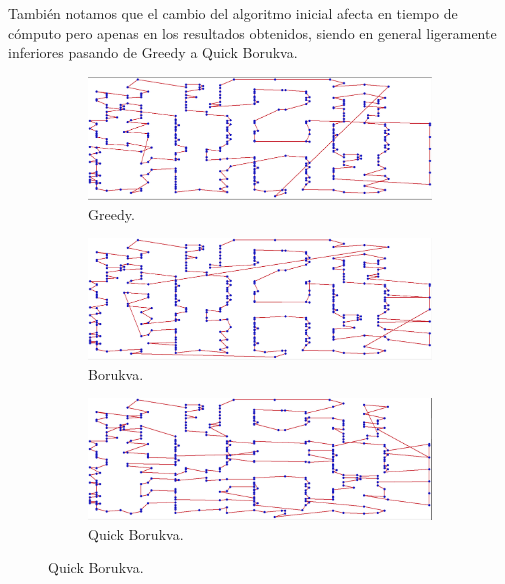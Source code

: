 \documentclass[13pt,a4paper]{article}
\begin{document}
También notamos que el cambio del algoritmo inicial afecta en tiempo de cómputo pero apenas en los resultados obtenidos, siendo en general ligeramente inferiores pasando de Greedy a Quick Borukva.

\begin{figure}[b]
    \centering 
    \begin{subfigure}[t]{0.3\textwidth}
      \centering
      \includegraphics[width=\textwidth]{img/1/G.png}
      \caption{Greedy.}
    \end{subfigure}
    \begin{subfigure}[t]{0.3\textwidth}
        \centering
        \includegraphics[width=\textwidth]{img/1/B.png}
        \caption{Borukva.}
    \end{subfigure}
    \begin{subfigure}[t]{0.3\textwidth}
      \centering
      \includegraphics[width=\textwidth]{img/1/Q.png}
      \caption{Quick Borukva.}
    \end{subfigure}


\end{figure}
\end{document}

